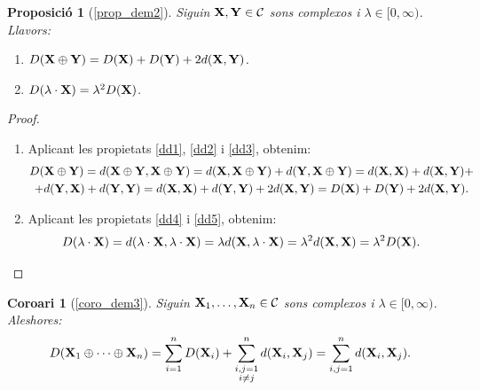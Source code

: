 \documentclass{article}
\theoremstyle{math}
\theoremstyle{TheoremNum}
\newtheorem{prop*}[definition]{Proposició}
\newtheorem{corollary*}[definition]{Coro\lgem ari}
\newcommand{\0}{\ensuremath{\vb{0}}}
\newcommand{\X}{\ensuremath{\vb{X}}}
\newcommand{\Y}{\ensuremath{\vb{Y}}}
\begin{document}
\begin{prop*}[\ref*{prop_dem2}]
    Siguin $\X,\Y\in\mathcal{C}$ sons complexos i $\lambda\in[0,\infty)$. Llavors:
    \begin{enumerate}[label=$D$\arabic*),ref=$D$\arabic*]
        \item\label{DD1} $D(\X\oplus\Y)=D(\X)+D(\Y)+2d(\X,\Y)$.
        \item\label{DD2} $D(\lambda\cdot \X)=\lambda^2D(\X)$.
    \end{enumerate}
\end{prop*}
\begin{proof}
    \hfill
    \begin{enumerate}[label=$D$\arabic*)]
        \item Aplicant les propietats \ref{dd1}, \ref{dd2} i \ref{dd3}, obtenim:
        \begin{multline*}
            D(\X\oplus\Y)=d(\X\oplus\Y,\X\oplus\Y)=d(\X,\X\oplus\Y)+d(\Y,\X\oplus\Y)=d(\X,\X)+d(\X,\Y)+\\+d(\Y,\X)+d(\Y,\Y)=d(\X,\X)+d(\Y,\Y)+2d(\X,\Y)=D(\X)+D(\Y)+2d(\X,\Y).
        \end{multline*}
        \item Aplicant les propietats \ref{dd4} i \ref{dd5}, obtenim: $$D(\lambda\cdot\X)=d(\lambda\cdot\X,\lambda\cdot\X)=\lambda d(\X,\lambda\cdot\X)=\lambda^2d(\X,\X)=\lambda^2D(\X).$$
    \end{enumerate}
\end{proof}
\begin{corollary*}[\ref*{coro_dem3}]
    Siguin $\X_1,\ldots,\X_n\in\mathcal{C}$ sons complexos i $\lambda\in[0,\infty)$. Aleshores: $$D(\X_1\oplus\cdots\oplus\X_n)=\sum_{i=1}^nD(\X_i)+\sum_{\substack{i,j=1\\i\ne j}}^nd(\X_i,\X_j)=\sum_{i,j=1}^nd(\X_i,\X_j).$$
\end{corollary*}
\end{document}
